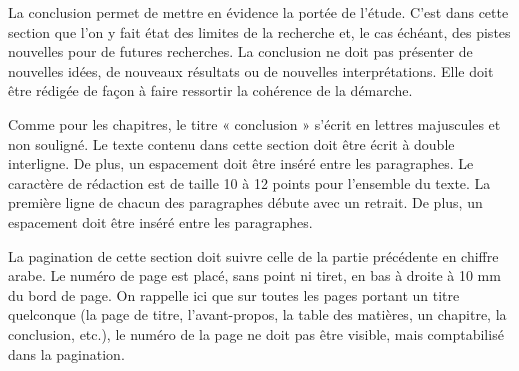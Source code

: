 \begin{conclusion}

La conclusion permet de mettre en évidence la portée de l’étude. C’est dans cette section que l’on y fait état des limites de la recherche et, le cas échéant,  des pistes nouvelles pour de futures recherches. La conclusion ne doit pas présenter de nouvelles idées, de nouveaux résultats ou de nouvelles interprétations. Elle doit être rédigée de façon à faire ressortir la cohérence de la démarche.

Comme pour les chapitres, le titre « conclusion » s’écrit en lettres majuscules et non souligné. Le texte contenu dans cette section doit être écrit à double interligne. De plus, un espacement doit être inséré entre les paragraphes. Le caractère de rédaction est de taille 10 à 12 points pour l’ensemble du texte. La première ligne de chacun des paragraphes débute avec un retrait. De plus, un espacement doit être inséré entre les paragraphes.

La pagination de cette section doit suivre celle de la partie précédente en chiffre arabe. Le numéro de page est placé, sans point ni tiret, en bas à droite à 10 mm du bord de page. On rappelle ici que sur toutes les pages portant un titre quelconque (la page de titre, l'avant-propos, la table des matières, un chapitre, la conclusion, etc.), le numéro de la page ne doit pas être visible, mais comptabilisé dans la pagination.

\end{conclusion}
